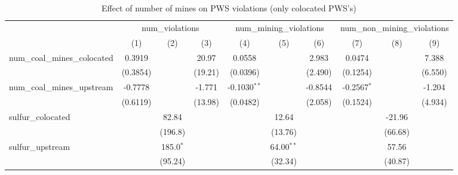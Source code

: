 
\begin{table}[htbp]
   \caption{\label{olsrf2sls_nummine_count_vio_1985to2005colocate} Effect of number of mines on PWS violations (only colocated PWS's)}
   \bigskip
   \centering
   \begin{adjustbox}{width = \textwidth, center}
      \begin{tabular}{lccccccccc}
         \toprule
          & \multicolumn{3}{c}{num\_violations} & \multicolumn{3}{c}{num\_mining\_violations} & \multicolumn{3}{c}{num\_non\_mining\_violations}\\
                                                            & (1)           & (2)           & (3)           & (4)            & (5)           & (6)           & (7)           & (8)           & (9)\\  
         \midrule 
         num\_coal\_mines\_colocated                        & 0.3919        &               & 20.97         & 0.0558         &               & 2.983         & 0.0474        &               & 7.388\\   
                                                            & (0.3854)      &               & (19.21)       & (0.0396)       &               & (2.490)       & (0.1254)      &               & (6.550)\\   
         num\_coal\_mines\_upstream                         & -0.7778       &               & -1.771        & -0.1030$^{**}$ &               & -0.8544       & -0.2567$^{*}$ &               & -1.204\\   
                                                            & (0.6119)      &               & (13.98)       & (0.0482)       &               & (2.058)       & (0.1524)      &               & (4.934)\\   
         sulfur\_colocated                                  &               & 82.84         &               &                & 12.64         &               &               & -21.96        &   \\   
                                                            &               & (196.8)       &               &                & (13.76)       &               &               & (66.68)       &   \\   
         sulfur\_upstream                                   &               & 185.0$^{*}$   &               &                & 64.00$^{**}$  &               &               & 57.56         &   \\   
                                                            &               & (95.24)       &               &                & (32.34)       &               &               & (40.87)       &   \\   

\end{tabular}
\end{adjustbox}
\end{table}
